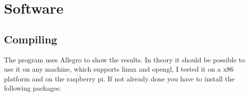 \documentclass[11pt, a4paper, UKenglish, parskip=half+]{scrbook}
\begin{document}
\begin{comment}
	
\begin{tikzpicture}[scale=2]
  \draw[color=black, thick]
  \foreach \i in {0,...,1}
  {
  	\foreach \j in {0,...,20}
  	{
  		(\i/4,\j/4) to [short,o-] (\i/4,\j/4){}
  	}
  }
  
    (1,0) to [short,o-] (6,0){} %
    (0,1) node[]{\large{\textbf{RASPBERRY PI}}}
    (5,0) node[ground]{} node[circ](4.5,0){}
    (0,2) to [pC, l=$C_1$, o-] (0.5,2)
    to [R,l=$R_1$,](1.5,2)
    to node[short]{}(2.6,2)
    (1.5,2) to [C, l=$C_2$, *-] (1.5,3) -| (5,3)
    (2.2,2) to [R, l=$R_2$, *-*] (2.2,3)
    (2.2,3) to [pC, l=$C_3$, *-] (2.2,5) -| (3,5)
    (3,0) to [R,l=$R_5$,-*] (3,1.5)
    to [Tnpn,n=npn1] (3,2.5)
    (npn1.E) node[right=3mm, above=5mm]{$Q_1$} %
    (4,0) to [pC, l_=$C_4$, *-] (4, 1.5)--(3,1.5)
    (2.2,0) to [vR, l=$R_3$, *-*] (2.2,2)
    (3,2.5) to node[short]{}(3,3)
    (3,5) to [pR, n=pot1, l_=$R_4$, *-] (3,3)
    (3,5) to [R, l=$R_6$, *-] (5,5)
    to [short,*-o](5,5.5) node[right]{$V_S=40 V$}
    (5,3) to [Tnigfetd,n=mos1] (5,5)
    (mos1.B) node[anchor=west]{$Q_2$} %
    (pot1.wiper)  to [R, l=$R_7$] (4.5,4) -| (mos1.G)
    (5,1.5) to [Tpigfetd,n=mos2] (5,2.5)
    (5,0) to (mos2.S)
    (3,2.5) to [R, l=$R_8$, *-] (4.5,2.5)
    -| (mos2.G)
    (mos2.B) node[anchor=west]{$Q_3$} %
    (6,3) to [pC, l=$C_5$,-*](5,3)
    (6,3) to [short,-o] (6,2){}
    (mos1.S)--(mos2.D)
    (6,0) to [short,-o] (6,1){} node[above=7mm]{\large{\textbf{SPEAKER}}}
    ;
\end{tikzpicture}
\end{comment}
\chapter{Software}
\section{Compiling}
The program uses Allegro to show the results. In theory it should be possible to use it on any machine, which supports linux and opengl, I tested it on a x86 platform and on the raspberry pi. If not already done you have to install the following packages:
\end{document}
